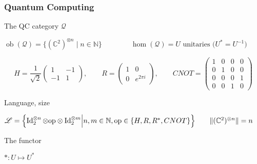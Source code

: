 \documentclass[10pt]{beamer}
\newcommand{\cat}[1]{\mathscr{#1}}
\renewcommand{\L}{\cat{L}}
\newcommand{\size}[1]{\lVert#1\rVert}
\DeclareMathOperator{\ob}{ob}
\DeclareMathOperator{\Id}{Id}
\newcommand{\N}{\mathbb{N}}
\newcommand{\Complex}{\mathbb{C}}
\begin{document}
\begin{frame}
  \frametitle{Quantum Computing}

  \begin{block}{The QC category $\cat{Q}$}
    \begin{center}
    $\ob(\cat{Q}) = \{\left(\Complex^2\right)^{\otimes n}\;|\;n\in\N\}
    \qquad\qquad \hom(\cat{Q}) = U \text{ unitaries
      ($U^\ast=U^{-1}$)}$
    \end{center}
  \end{block}

  \begin{equation*}
    H = \frac{1}{\sqrt{2}}\begin{pmatrix}
      1 & -1 \\ -1 & 1
    \end{pmatrix},
    \qquad
    R = \begin{pmatrix}
      1 & 0 \\ 0 & e^{2\pi i }
    \end{pmatrix},
    \qquad
    CNOT = \begin{pmatrix}
      1 & 0 & 0 & 0\\
      0 & 1 & 0 & 0\\
      0 & 0 & 0 & 1\\
      0 & 0 & 1 & 0
    \end{pmatrix}
  \end{equation*}

  \begin{block}{Language, size}
    \begin{center}
      $\L = \Bigl\{\Id_2^{\otimes
        n}\otimes\mathrm{op}\otimes\Id_2^{\otimes m}\Bigl\lvert
      n,m\in\N, \mathrm{op}\in\{H,R,R^\ast,CNOT\} \Bigr\} \qquad
      \size{(\Complex^2)^{\otimes n}} = n$
    \end{center}
  \end{block}
  
  \begin{block}{The functor}
    \begin{center}
      $\ast : U\mapsto U^\ast$
    \end{center}
  \end{block}
\end{frame}
\end{document}
